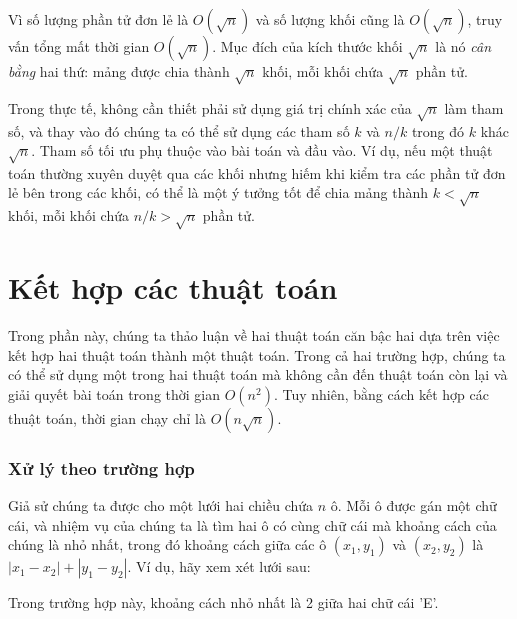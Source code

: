 Vì số lượng phần tử đơn lẻ là $O(\sqrt n)$
và số lượng khối cũng là $O(\sqrt n)$,
truy vấn tổng mất thời gian $O(\sqrt n)$.
Mục đích của kích thước khối $\sqrt n$ là
nó \emph{cân bằng} hai thứ:
mảng được chia thành $\sqrt n$ khối,
mỗi khối chứa $\sqrt n$ phần tử.

Trong thực tế, không cần thiết phải sử dụng
giá trị chính xác của $\sqrt n$ làm tham số,
và thay vào đó chúng ta có thể sử dụng các tham số $k$ và $n/k$ trong đó $k$
khác $\sqrt n$.
Tham số tối ưu phụ thuộc vào bài toán và đầu vào.
Ví dụ, nếu một thuật toán thường xuyên
duyệt qua các khối nhưng hiếm khi kiểm tra
các phần tử đơn lẻ bên trong các khối,
có thể là một ý tưởng tốt để chia mảng thành
$k < \sqrt n$ khối, mỗi khối chứa $n/k > \sqrt n$
phần tử.

\section{Kết hợp các thuật toán}

Trong phần này, chúng ta thảo luận về hai thuật toán căn bậc hai
dựa trên việc kết hợp hai thuật toán thành một thuật toán.
Trong cả hai trường hợp, chúng ta có thể sử dụng một trong hai thuật toán
mà không cần đến thuật toán còn lại
và giải quyết bài toán trong thời gian $O(n^2)$.
Tuy nhiên, bằng cách kết hợp các thuật toán, thời gian
chạy chỉ là $O(n \sqrt n)$.

\subsubsection{Xử lý theo trường hợp}

Giả sử chúng ta được cho một
lưới hai chiều chứa $n$ ô.
Mỗi ô được gán một chữ cái,
và nhiệm vụ của chúng ta là tìm hai ô
có cùng chữ cái mà khoảng cách của chúng là nhỏ nhất,
trong đó khoảng cách giữa các ô
$(x_1,y_1)$ và $(x_2,y_2)$ là $|x_1-x_2|+|y_1-y_2|$.
Ví dụ, hãy xem xét lưới sau:

\begin{center}
\end{center}
Trong trường hợp này, khoảng cách nhỏ nhất là 2 giữa hai chữ cái 'E'.


